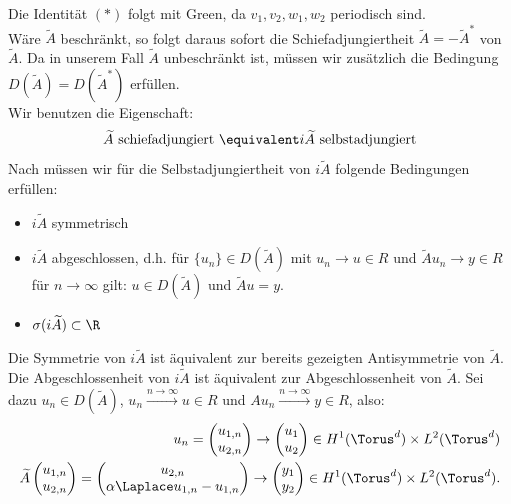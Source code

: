 Die Identität $(*)$ folgt mit Green, da $v_1,v_2,w_1,w_2$ periodisch sind.\\
Wäre $\widetilde{A}$ beschränkt, so folgt daraus sofort die Schiefadjungiertheit $\widetilde{A}=-\widetilde{A}^*$ von $\widetilde{A}$. Da in unserem Fall $\widetilde{A}$ unbeschränkt ist, müssen wir zusätzlich die Bedingung $D(\widetilde{A})=D(\widetilde{A}^*)$ erfüllen.\\
Wir benutzen die Eigenschaft:
\[\widetilde{A} \text{ schiefadjungiert } \equivalent i\widetilde{A} \text{ selbstadjungiert}\]
Nach \autocite[Bemerkung 5.6f]{HundSchnau} müssen wir für die Selbstadjungiertheit von $i\widetilde{A}$ folgende Bedingungen erfüllen:
\begin{itemize}
\item $i\widetilde{A}$ symmetrisch
\item $i\widetilde{A}$ abgeschlossen, d.h. für $\lbrace u_n \rbrace \in D(\widetilde{A})$ mit $u_n\to u\in R$ und $\widetilde{A}u_n\to y\in R$ für $n\to\infty$ gilt: $u\in D(\widetilde{A})$ und $\widetilde{A}u=y$.
\item $\sigma(i\widetilde{A})\subset \R$
\end{itemize}
Die Symmetrie von $i\widetilde{A}$ ist äquivalent zur bereits gezeigten Antisymmetrie von $\widetilde{A}$.\\
Die Abgeschlossenheit von $i\widetilde{A}$ ist äquivalent zur Abgeschlossenheit von $\widetilde{A}$. Sei dazu $u_n\in D(\widetilde{A})$, $u_n\xrightarrow{n \to \infty }u\in R$ und $Au_n\xrightarrow{n \to \infty }y\in R$, also:
\begin{align*}
u_n=\begin{pmatrix}u_{1,n}\\u_{2,n}\end{pmatrix}\to\begin{pmatrix}u_1\\u_2\end{pmatrix}\in H^1(\Torus^d)\times L^2(\Torus^d)\\
\widetilde{A}\begin{pmatrix}u_{1,n}\\u_{2,n}\end{pmatrix}=\begin{pmatrix}u_{2,n}\\\alpha\Laplace u_{1,n}-u_{1,n}\end{pmatrix}\to\begin{pmatrix}y_1\\y_2\end{pmatrix}\in H^1(\Torus^d)\times L^2(\Torus^d).
\end{align*} 
